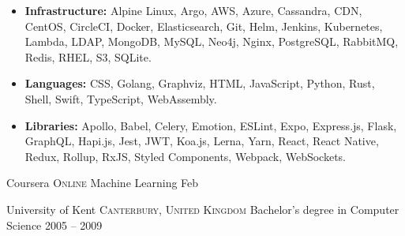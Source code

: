 \documentclass[10pt,a4paper]{article}
\begin{document}

\begin{indentsection}
\item
\begin{itemize}[leftmargin=0cm]

    \item \textbf{Infrastructure:} Alpine Linux, Argo, AWS, Azure, Cassandra, CDN, CentOS, CircleCI, Docker, Elasticsearch, Git, Helm, Jenkins, Kubernetes, Lambda, LDAP, MongoDB, MySQL, Neo4j, Nginx, PostgreSQL, RabbitMQ, Redis, RHEL, S3, SQLite.
    \item \textbf{Languages:} CSS, Golang, Graphviz, HTML, JavaScript, Python, Rust, Shell, Swift, TypeScript, WebAssembly.
    \item \textbf{Libraries:} Apollo, Babel, Celery, Emotion, ESLint, Expo, Express.js, Flask, GraphQL, Hapi.js, Jest, JWT, Koa.js, Lerna, Yarn, React, React Native, Redux, Rollup, RxJS, Styled Components, Webpack, WebSockets.

\end{itemize}
\end{indentsection}

\spacedhrule{1.5em}{0em}


\headedsection
  {Coursera}
  {\textsc{Online}} {%
  \headedsubsection
    {Machine Learning}
    {Feb }
    {
  }
}

\headedsection
  {University of Kent}
  {\textsc{Canterbury, United Kingdom}} {%
  \headedsubsection
    {Bachelor's degree in Computer Science}
    {2005 -- 2009}
    {\bodytext{}
  }
}
\end{document}
